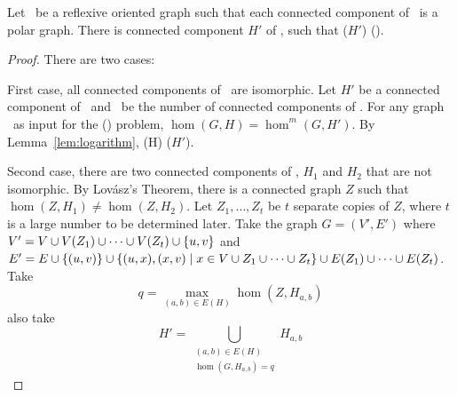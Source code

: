 \begin{lemma} \label{lem:onecomp}
Let \mH\ be a reflexive oriented graph such that each connected component of \mH\ is a polar graph.
There is connected component \(H'\) of \mH, such that \chom(\(H'\)) \maple \chom(\mH)\@.
\end{lemma}

\begin{proof}
There are two cases:

First case, all connected components of \mH\ are isomorphic.
Let \(H'\) be a connected component of \mH\ and
\mm\ be the number of connected components of \mH\@.
For any graph \mG\ as input for the \chom(\mH) problem, \(\hom(G,H)=\hom^m(G,H')\).
By Lemma~\ref{lem:logarithm}, \chom(H) \mapge \chom(\(H'\))\@.

Second case, there are two connected components of \mH, \(H_1\) and \(H_2\) that are not isomorphic.
By Lov\'{a}sz's Theorem, there is a connected graph \(Z\) such that \(\hom(Z,H_1) \neq \hom(Z,H_2)\)\@.
Let \(Z_1,\dotsc,Z_t\) be \(t\) separate copies of \(Z\), where \(t\) is a large number to be 
determined later.
Take the graph \(G=(V',E')\) where \(V'=V \cup V(Z_1)\cup \dotsb \cup V(Z_t) \cup \{{u,v}\} \)
and \(E'=E \cup \{{(u,v)}\} \cup \{{(u,x),(x,v) \mid x \in V \cup  Z_1 \cup \dotsb \cup Z_t}\} \cup
E(Z_1)\cup \dotsb \cup E(Z_t)\)\@. Take \[q= \max \limits_{(a,b) \in E(H)} \hom(Z,H_{a,b})\] also 
take \[H'=\bigcup_{\substack{(a,b)\in E(H) \\ 
\hom(G,H_{a,b})=q}} H_{a,b}\]


\end{proof}
